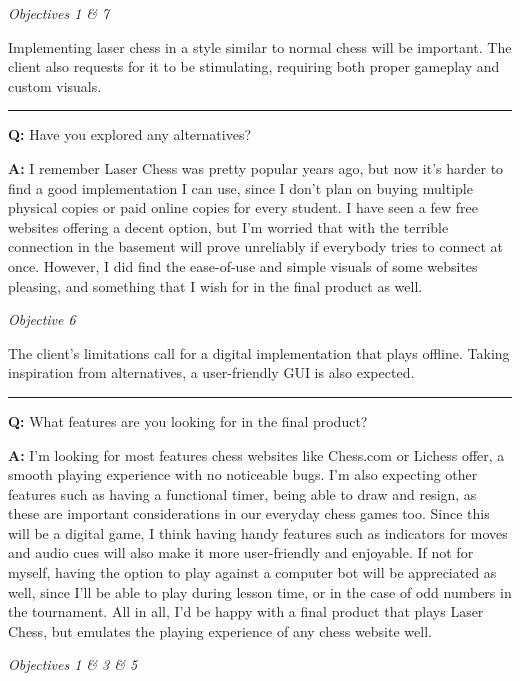 \documentclass[../main/main.tex]{subfiles}
\begin{document}
\bigskip

\noindent\textit{Objectives 1 \& 7}

\noindent Implementing laser chess in a style similar to normal chess will be important. The client also requests for it to be stimulating, requiring both proper gameplay and custom visuals.

\noindent\rule{\textwidth}{0.4pt}

\noindent\textbf{Q:} Have you explored any alternatives?

\noindent\textbf{A:} I remember Laser Chess was pretty popular years ago, but now it’s harder to find a good implementation I can use, since I don’t plan on buying multiple physical copies or paid online copies for every student. I have seen a few free websites offering a decent option, but I’m worried that with the terrible connection in the basement will prove unreliably if everybody tries to connect at once. However, I did find the ease-of-use and simple visuals of some websites pleasing, and something that I wish for in the final product as well.

\bigskip

\noindent\textit{Objective 6}

\noindent The client’s limitations call for a digital implementation that plays offline. Taking inspiration from alternatives, a user-friendly GUI is also expected.

\noindent\rule{\textwidth}{0.4pt}

\noindent\textbf{Q:} What features are you looking for in the final product?

\noindent\textbf{A:} I’m looking for most features chess websites like Chess.com or Lichess offer, a smooth playing experience with no noticeable bugs. I’m also expecting other features such as having a functional timer, being able to draw and resign, as these are important considerations in our everyday chess games too. Since this will be a digital game, I think having handy features such as indicators for moves and audio cues will also make it more user-friendly and enjoyable. If not for myself, having the option to play against a computer bot will be appreciated as well, since I’ll be able to play during lesson time, or in the case of odd numbers in the tournament. All in all, I’d be happy with a final product that plays Laser Chess, but emulates the playing experience of any chess website well.

\bigskip

\noindent\textit{Objectives 1 \& 3 \& 5}
\end{document}

